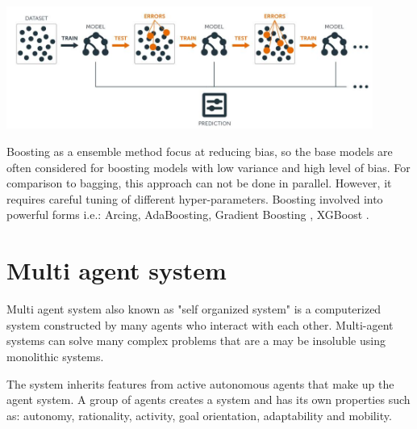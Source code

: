 \begin{center}
	\includegraphics[width=12cm, keepaspectratio]{diagrams/boosting.jpg}
	\center
	\label{fig:Boosting}
\end{center}

Boosting as a ensemble method focus at reducing bias, so the base models are often considered for boosting models with low variance and high level of bias. For comparison to bagging, this approach can not be done in parallel. However, it requires careful tuning of different hyper-parameters.
Boosting involved into powerful forms i.e.: Arcing\cite{ArcingBoosting}, AdaBoosting\cite{AdaBoostBoosting}, Gradient Boosting \cite{GradientBoosting}, XGBoost \cite{XGBoosting}.

\newpage
\section{Multi agent system}

Multi agent system also known as "self organized system" is a computerized system constructed by many agents who interact with each other. Multi-agent systems can solve many complex problems that are a may be insoluble using monolithic systems. 

The system inherits features from active autonomous agents that make up the agent system. A group of agents creates a system and has its own properties such as: autonomy, rationality, activity, goal orientation, adaptability and mobility.

